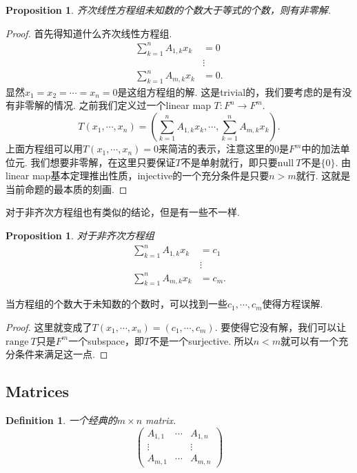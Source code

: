 \documentclass{article}
\newtheorem{proposition}[theorem]{Proposition}
\newtheorem{definition}[theorem]{Definition}
\newcommand*{\xfunc}[4]{{#2}\colon{#3}{#1}{#4}}
\newcommand*{\func}[3]{\xfunc{\to}{#1}{#2}{#3}}
\newcommand\nul[1]{\text{null}\ #1}
\newcommand\range[1]{\text{range}\ #1}
\begin{document}
\begin{proposition}
齐次线性方程组未知数的个数大于等式的个数，则有非零解.
\end{proposition}

\begin{proof}
首先得知道什么齐次线性方程组.
$$
\begin{aligned}
\sum\limits_{k=1}^{n}A_{1,k}x_k&=0 \\
&\vdots\\
\sum\limits_{k=1}^{n}A_{m,k}x_k&=0.
\end{aligned}
$$
显然$x_1=x_2=\cdots=x_n = 0$是这组方程组的解. 这是trivial的，我们要考虑的是有没有非零解的情况. 之前我们定义过一个linear map $\func{T}{F^n}{F^m}$.
$$
	T(x_1,\cdots,x_n)  = (\sum\limits_{k=1}^{n}A_{1,k}x_k,\cdots,\sum\limits_{k=1}^{n}A_{m,k}x_k).
$$
上面方程组可以用$T(x_1,\cdots,x_n)=0$来简洁的表示，注意这里的$0$是$F^m$中的加法单位元. 我们想要非零解，在这里只要保证$T$不是单射就行，即只要$\nul{T}$不是$\{0\}$. 由linear map基本定理推出性质，injective的一个充分条件是只要$n>m$就行. 这就是当前命题的最本质的刻画.
\end{proof}

{\color{red} 对于非齐次方程组也有类似的结论，但是有一些不一样}.

\begin{proposition}
对于非齐次方程组
$$
\begin{aligned}
\sum\limits_{k=1}^{n}A_{1,k}x_k&=c_1 \\
&\vdots\\
\sum\limits_{k=1}^{n}A_{m,k}x_k&=c_m.
\end{aligned}
$$
\end{proposition}
当方程组的个数大于未知数的个数时，可以找到一些$c_1,\cdots,c_m$使得方程误解.

\begin{proof}
这里就变成了$T(x_1,\cdots,x_n) =  (c_1,\cdots,c_m)$. 要使得它没有解，我们可以让$\range{T}$只是$F^m$一个subspace，即$T$不是一个surjective. 所以$n<m$就可以有一个充分条件来满足这一点.
\end{proof}

\newpage
\subsection{Matrices}

\begin{definition}
\rm 一个经典的$m \times n$ matrix.
$$
\begin{pmatrix}
A_{1,1} & \cdots & A_{1,n} \\
\vdots & & \vdots \\
A_{m,1} & \cdots & A_{m,n}
\end{pmatrix}
$$
\end{definition}
\end{document}
